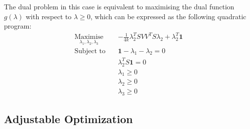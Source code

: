 The dual problem in this case is equivalent to maximising the dual function $g(\lambda)$ with respect to $\lambda\ge0$, which can be expressed as the following quadratic program:
\begin{align*}
    \underset{\lambda_1, \lambda_2, \lambda_3}{\text{Maximise}} \quad & -\frac{1}{4k}\lambda_2^TSVV^TS\lambda_2 + \lambda_2^T\mathbf{1} \\
    \text{Subject to} \quad & \mathbf{1} - \lambda_1 - \lambda_2 = 0 \\
    & \lambda_2^TS\mathbf{1} = 0 \\
    & \lambda_1 \ge 0 \\
    & \lambda_2 \ge 0 \\
    & \lambda_3 \ge 0
\end{align*}

\subsection{Adjustable Optimization}
